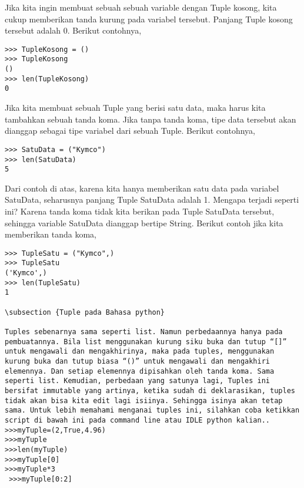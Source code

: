 Jika kita ingin membuat sebuah sebuah variable dengan Tuple kosong, kita cukup memberikan tanda kurung pada variabel tersebut. Panjang Tuple kosong tersebut adalah 0. Berikut contohnya,
\begin{verbatim}
>>> TupleKosong = ()
>>> TupleKosong
()
>>> len(TupleKosong)
0
\end{verbatim}
Jika kita membuat sebuah Tuple yang berisi satu data, maka harus kita tambahkan sebuah tanda koma. Jika tanpa tanda koma, tipe data tersebut akan dianggap sebagai tipe variabel dari sebuah Tuple. Berikut contohnya,
\begin{verbatim}
>>> SatuData = ("Kymco")
>>> len(SatuData)
5
\end{verbatim}
Dari contoh di atas, karena kita hanya memberikan satu data pada variabel SatuData, seharusnya panjang Tuple SatuData adalah 1. Mengapa terjadi seperti ini? Karena tanda koma tidak kita berikan pada Tuple SatuData tersebut, sehingga variable SatuData dianggap bertipe String. Berikut contoh jika kita memberikan tanda koma,
\begin{verbatim}
>>> TupleSatu = ("Kymco",)
>>> TupleSatu
('Kymco',)
>>> len(TupleSatu)
1

\subsection {Tuple pada Bahasa python}

Tuples sebenarnya sama seperti list. Namun perbedaannya hanya pada pembuatannya. Bila list menggunakan kurung siku buka dan tutup “[]” untuk mengawali dan mengakhirinya, maka pada tuples, menggunakan kurung buka dan tutup biasa “()” untuk mengawali dan mengakhiri elemennya. Dan setiap elemennya dipisahkan oleh tanda koma. Sama seperti list. Kemudian, perbedaan yang satunya lagi, Tuples ini bersifat immutable yang artinya, ketika sudah di deklarasikan, tuples tidak akan bisa kita edit lagi isiinya. Sehingga isinya akan tetap sama. Untuk lebih memahami menganai tuples ini, silahkan coba ketikkan script di bawah ini pada command line atau IDLE python kalian..
>>>myTuple=(2,True,4.96) 
>>>myTuple 
>>>len(myTuple) 
>>>myTuple[0] 
>>>myTuple*3
 >>>myTuple[0:2]
\end{verbatim}

